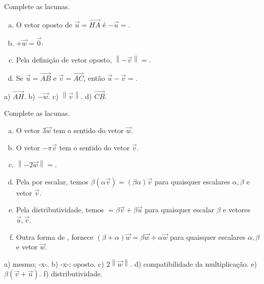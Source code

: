 \begin{exer}
  Complete as lacunas.
  \begin{enumerate}[a)]
    \item O vetor oposto de $\vec{u}=\overrightarrow{HA}$ é $-\vec{u}=$\underline{}.
    \item \underline{}$+\vec{w}=\vec{0}$.
    \item Pela definição de vetor oposto, $\left\|-\vec{v}\right\|=$\underline{}.
    \item Se $\vec{u}=\overrightarrow{AB}$ e $\vec{v}=\overrightarrow{AC}$, então $\vec{u}-\vec{v}=$\underline{}.
  \end{enumerate}
\end{exer}
\begin{resp}
  a) $\overrightarrow{AH}$. b) $-\vec{w}$. c) $\left\|\vec{v}\right\|$. d) $\overrightarrow{CB}$.
\end{resp}

\begin{exer}
  Complete as lacunas.
  \begin{enumerate}[a)]
    \item O vetor $3\vec{w}$ tem o \underline{\phantom{mesmo}} sentido \underline{\phantom{oposto}} do vetor $\vec{w}$.
    \item O vetor $-\pi\vec{v}$ tem o \underline{\phantom{mesmo}} sentido \underline{\phantom{oposto}} do vetor $\vec{v}$.
    \item $\left\|-2\vec{w}\right\|=$\underline{}.
    \item Pela \underline{\phantom{compatibilidade da multiplicação}} por escalar, temos $\beta(\alpha\vec{v})=(\beta\alpha)\vec{v}$ para quaisquer escalares $\alpha,\beta$ e vetor $\vec{v}$.
    \item Pela distributividade, temos \underline{}$=\beta\vec{v}+\beta\vec{u}$ para quaisquer escalar $\beta$ e vetores $\vec{u},\vec{v}$.
    \item Outra forma de \underline{\phantom{distributividade}}, fornece $(\beta + \alpha)\vec{w} = \beta\vec{w} + \alpha\vec{w}$ para quaisquer escalares $\alpha,\beta$ e vetor $\vec{w}$.
  \end{enumerate}
\end{exer}
\begin{resp}
  a) mesmo; -x-. b) -x-; oposto. c) $2\left\|\vec{w}\right\|$. d) compatibilidade da multiplicação. e) $\beta(\vec{v}+\vec{u})$. f) distributividade.
\end{resp}


